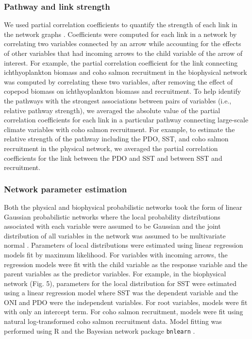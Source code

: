 \subsubsection{Pathway and link strength}

We used partial correlation coefficients to quantify the strength of each link
in the network graphs \citep{Zar1999a, Scutari2010, Yang2011}.  Coefficients
were computed for each link in a network by correlating two variables connected
by an arrow while accounting for the effects of other variables that had
incoming arrows to the child variable of the arrow of interest. For example, the
partial correlation coefficient for the link connecting ichthyoplankton biomass
and coho salmon recruitment in the biophysical network was computed by
correlating these two variables, after removing the effect of copepod biomass on
ichthyoplankton biomass and recruitment. To help identify the pathways with the
strongest associations between pairs of variables (i.e., relative pathway
strength), we averaged the absolute value of the partial correlation
coefficients for each link in a particular pathway connecting large-scale
climate variables with coho salmon recruitment.  For example, to estimate the
relative strength of the pathway including the PDO, SST, and coho salmon
recruitment in the physical network, we averaged the partial correlation
coefficients for the link between the PDO and SST and between SST and
recruitment.


\subsubsection{Network parameter estimation}

Both the physical and biophysical probabilistic networks took the form of linear
Gaussian probabilistic networks where the local probability distributions
associated with each variable were assumed to be Gaussian and the joint
distribution of all variables in the network was assumed to be multivariate
normal \citep{Shachter1989a, Koller2009a}. Parameters of local distributions
were estimated using linear regression models fit by maximum likelihood. For
variables with incoming arrows, the regression models were fit with the child
variable as the response variable and the parent variables as the predictor
variables. For example, in the biophysical network (Fig. 5), parameters for the
local distribution for SST were estimated using a linear regression model where
SST was the dependent variable and the ONI and PDO were the independent
variables. For root variables, models were fit with only an intercept term. For
coho salmon recruitment, models were fit using natural log-transformed coho
salmon recruitment data. Model fitting was performed using R and the Bayesian
network package \texttt{bnlearn} \citep{Scutari2010, Rcore2013a}.

